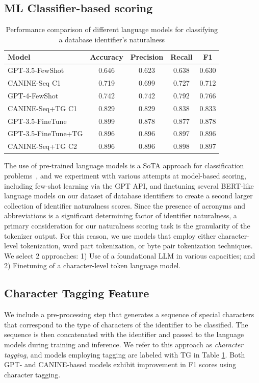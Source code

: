 \subsection{ML Classifier-based scoring}

\begin{table}[t]
  \centering
  \begin{tabular}{|p{2cm}|cccc|}
  \hline
  \textbf{Model} & \textbf{Accuracy} & \textbf{Precision} & \textbf{Recall} & \textbf{F1} \\
  \hline
  GPT-3.5-FewShot & 0.646 & 0.623 & 0.638 & 0.630 \\
  \hline
  CANINE-Seq C1 & 0.719 & 0.699 & 0.727 & 0.712 \\
  \hline
  GPT-4-FewShot & 0.742 & 0.742 & 0.792 & 0.766 \\
  \hline
  CANINE-Seq+TG C1 & 0.829 & 0.829 & 0.838 & 0.833 \\
  \hline
  GPT-3.5-FineTune & 0.899 & 0.878 & 0.877 & 0.878 \\
  \hline
  GPT-3.5-FineTune+TG & 0.896 & 0.896 & 0.897 & 0.896 \\
  \hline
  CANINE-Seq+TG C2 & 0.896 & 0.896 & 0.898 & 0.897 \\
  \hline
  \end{tabular}
  \caption{Performance comparison of different language models for classifying a database identifier's naturalness}
  \label{table:classifierperformance}
\end{table}

The use of pre-trained language models is a SoTA approach for classification problems~\cite{10.1145/3605943}, and we experiment with various attempts at model-based scoring, including few-shot learning via the GPT API, and finetuning several BERT-like language models on our dataset of database identifiers to create a second larger collection of identifier naturalness scores. 
Since the presence of acronyms and abbreviations is a significant determining factor of identifier naturalness, a primary consideration for our naturalness scoring task is the granularity of the tokenizer output.
For this reason, we use models that employ either character-level tokenization, word part tokenization, or byte pair tokenization techniques.
We select 2 approaches: 1) Use of a foundational LLM in various capacities; and 2) Finetuning of a character-level token language model.

\subsection{Character Tagging Feature}
We include a pre-processing step that generates a sequence of special characters that correspond to the type of characters of the identifier to be classified. 
The sequence is then concatenated with the identifier and passed to the language models during training and inference.
We refer to this approach as \emph{character tagging}, and models employing tagging are labeled with TG in Table \ref{table:classifierperformance}.
Both GPT- and CANINE-based models exhibit improvement in F1 scores using character tagging.

